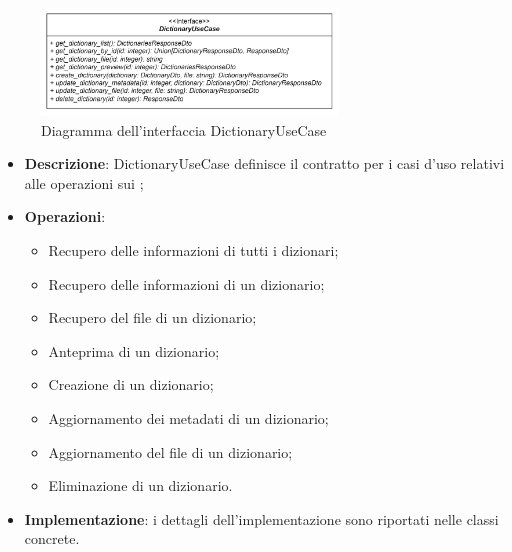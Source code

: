 \label{DictionaryUseCase}
\begin{figure}[H]
    \centering
    \includegraphics[width=0.7\textwidth]{assets/Backend/dictionary_use_case.png}
    \caption{Diagramma dell'interfaccia DictionaryUseCase}
  \end{figure}
\begin{itemize}
    \item \textbf{Descrizione}: DictionaryUseCase definisce il contratto per i casi d'uso relativi alle operazioni sui ;
    \item \textbf{Operazioni}:
    \begin{itemize}
      \item Recupero delle informazioni di tutti i dizionari;
      \item Recupero delle informazioni di un dizionario;
      \item Recupero del file di un dizionario;
      \item Anteprima di un dizionario;
      \item Creazione di un dizionario;
      \item Aggiornamento dei metadati di un dizionario;
      \item Aggiornamento del file di un dizionario;
      \item Eliminazione di un dizionario.
    \end{itemize}
    \item \textbf{Implementazione}: i dettagli dell'implementazione sono riportati nelle classi concrete.
\end{itemize}  

